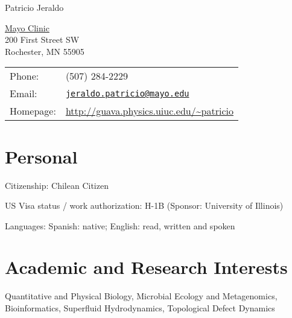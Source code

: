 \documentclass[letterpaper]{article}
\def\name{Patricio Jeraldo}
\renewenvironment{itemize}{
  \begin{list}{}{
    \setlength{\leftmargin}{1.5em}
  }
}{
  \end{list}
}
\begin{document}
{\huge \name}


\vspace{0.25in}

\begin{minipage}[t]{0.45\linewidth}
\vspace{0pt}
  \href{http://mayoclinic.org}{Mayo Clinic} \\
  200 First Street SW \\
  Rochester, MN 55905
\end{minipage}
\begin{minipage}[t]{0.45\linewidth}
\vspace{0pt}
  \begin{tabular}{ll}
    Phone: & (507) 284-2229 \\
    Email: & \href{mailto:jeraldo.patricio@mayo.edu}{\tt jeraldo.patricio@mayo.edu} \\
    Homepage: & \href{http://guava.physics.uiuc.edu/~patricio}{\url{
    http://guava.physics.uiuc.edu/~patricio}}
    \\
  \end{tabular}
\end{minipage}


\section*{Personal}

\begin{itemize}
\item Citizenship: Chilean Citizen
\item US Visa status / work authorization: H-1B (Sponsor: University of Illinois)
\item Languages: Spanish: native; English: read, written and spoken
\end{itemize}

\section*{Academic and Research Interests}

\begin{itemize}
  \item Quantitative and Physical Biology, Microbial Ecology and
Metagenomics, Bioinformatics, Superfluid Hydrodynamics, Topological Defect
Dynamics 
\end{itemize}
\end{document}
